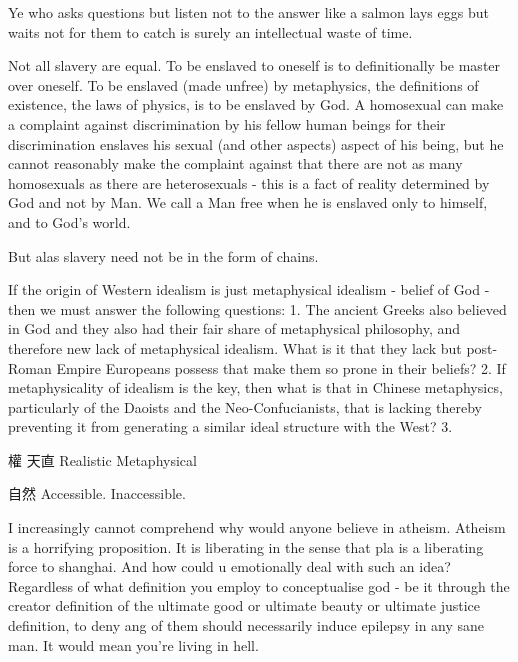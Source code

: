 Ye who asks questions but listen not to the answer like a salmon lays eggs but waits not for them to catch is surely an intellectual waste of time. 

Not all slavery are equal. To be enslaved to oneself is to definitionally be master over oneself. To be enslaved (made unfree) by metaphysics, the definitions of existence, the laws of physics, is to be enslaved by God. A homosexual can make a complaint against discrimination by his fellow human beings for their discrimination enslaves his sexual (and other aspects) aspect of his being, but he cannot reasonably make the complaint against that there are not as many homosexuals as there are heterosexuals - this is a fact of reality determined by God and not by Man. We call a Man free when he is enslaved only to himself, and to God's world. 




But alas slavery need not be in the form of chains. 



If the origin of Western idealism is just metaphysical idealism - belief of God - then we must answer the following questions: 
1. The ancient Greeks also believed in God and they also had their fair share of metaphysical philosophy, and therefore new lack of metaphysical idealism. What is it that they lack but post-Roman Empire Europeans possess that make them so prone in their beliefs?
2. If metaphysicality of idealism is the key, then what is that in Chinese metaphysics, particularly of the Daoists and the Neo-Confucianists, that is lacking thereby preventing it from generating a similar ideal structure with the West?
3. 

權 天直
Realistic 
Metaphysical 

自然
 Accessible. Inaccessible. 




I increasingly cannot comprehend why would anyone believe in atheism. Atheism is a horrifying proposition. It is liberating in the sense that pla is a liberating force to shanghai. And how could u emotionally deal with such an idea? Regardless of what definition you employ to conceptualise god - be it through the creator definition of the ultimate good or ultimate beauty or ultimate justice definition, to deny ang of them should necessarily induce epilepsy in any sane man. It would mean you’re living in hell. 



